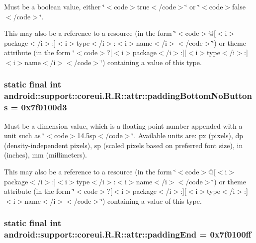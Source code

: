 Must be a boolean value, either \char`\"{}$<$code$>$true$<$/code$>$\char`\"{} or \char`\"{}$<$code$>$false$<$/code$>$\char`\"{}. 

This may also be a reference to a resource (in the form \char`\"{}$<$code$>$@\mbox{[}$<$i$>$package$<$/i$>$:\mbox{]}$<$i$>$type$<$/i$>$:$<$i$>$name$<$/i$>$$<$/code$>$\char`\"{}) or theme attribute (in the form \char`\"{}$<$code$>$?\mbox{[}$<$i$>$package$<$/i$>$:\mbox{]}\mbox{[}$<$i$>$type$<$/i$>$:\mbox{]}$<$i$>$name$<$/i$>$$<$/code$>$\char`\"{}) containing a value of this type. \hypertarget{classandroid_1_1support_1_1coreui_1_1_r_1_1attr_f833ce9c57bd087f2c04420ed6db1adf}{
\subsubsection[{paddingBottomNoButtons}]{\setlength{\rightskip}{0pt plus 5cm}static final int android::support::coreui.R.R::attr::paddingBottomNoButtons = 0x7f0100d3}}
\label{classandroid_1_1support_1_1coreui_1_1_r_1_1attr_f833ce9c57bd087f2c04420ed6db1adf}


Must be a dimension value, which is a floating point number appended with a unit such as \char`\"{}$<$code$>$14.5sp$<$/code$>$\char`\"{}. Available units are: px (pixels), dp (density-independent pixels), sp (scaled pixels based on preferred font size), in (inches), mm (millimeters). 

This may also be a reference to a resource (in the form \char`\"{}$<$code$>$@\mbox{[}$<$i$>$package$<$/i$>$:\mbox{]}$<$i$>$type$<$/i$>$:$<$i$>$name$<$/i$>$$<$/code$>$\char`\"{}) or theme attribute (in the form \char`\"{}$<$code$>$?\mbox{[}$<$i$>$package$<$/i$>$:\mbox{]}\mbox{[}$<$i$>$type$<$/i$>$:\mbox{]}$<$i$>$name$<$/i$>$$<$/code$>$\char`\"{}) containing a value of this type. \hypertarget{classandroid_1_1support_1_1coreui_1_1_r_1_1attr_e45265d27ff148df8e46679799cb0fb3}{
\subsubsection[{paddingEnd}]{\setlength{\rightskip}{0pt plus 5cm}static final int android::support::coreui.R.R::attr::paddingEnd = 0x7f0100ff}}
\label{classandroid_1_1support_1_1coreui_1_1_r_1_1attr_e45265d27ff148df8e46679799cb0fb3}


